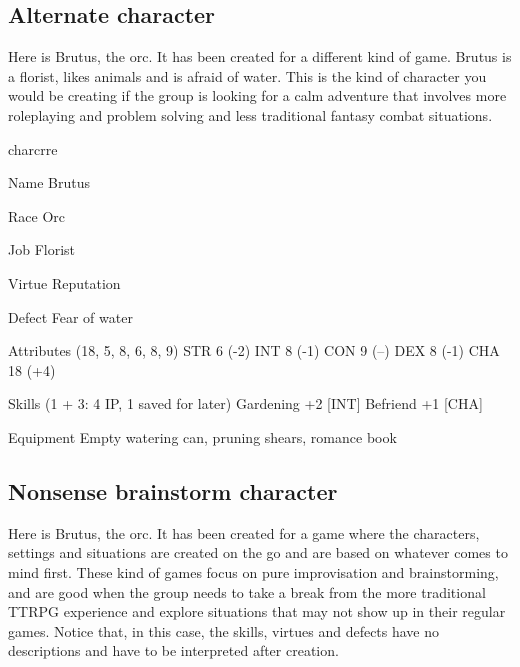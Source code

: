 \subsection*{Alternate character}

Here is Brutus, the orc. It has been created for a different kind of game. Brutus is a florist, likes animals and is afraid of water. This is the kind of character you would be creating if the group is looking for a calm adventure that involves more roleplaying and problem solving and less traditional fantasy combat situations.

\begin{labeling}{charcrre}
\item [Name] Brutus
\item [Race] Orc
\item [Job] Florist
\item [Virtue] Reputation
\item [Defect] Fear of water
\item [Attributes] (18, 5, 8, 6, 8, 9) \linebreak
STR 6 (-2)\linebreak
INT 8  (-1)\linebreak
CON 9  (--)\linebreak
DEX 8  (-1)\linebreak
CHA 18  (+4)\linebreak
\item [Skills] (1 + 3: 4 IP, 1 saved for later)\linebreak
Gardening +2 [INT]\linebreak
Befriend +1 [CHA]
\item [Equipment] Empty watering can, pruning shears, romance book
\end{labeling}

\subsection*{Nonsense brainstorm character}

Here is Brutus, the orc. It has been created for a game where the characters, settings and situations are created on the go and are based on whatever comes to mind first. These kind of games focus on pure improvisation and brainstorming, and are good when the group needs to take a break from the more traditional TTRPG experience and explore situations that may not show up in their regular games. Notice that, in this case, the skills, virtues and defects have no descriptions and have to be interpreted after creation.

